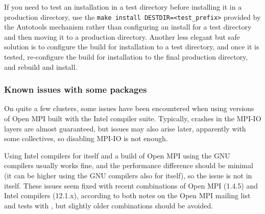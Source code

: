 \documentclass[a4paper,10pt,twoside]{article}
\begin{document}
If you need to test an installation in a test directory before
installing it in a production directory, use the
\texttt{make install DESTDIR=<test\_prefix>} provided
by the Autotools mechanism rather than configuring an install for a
test directory and then moving it to a production directory.
Another less elegant but safe solution is to configure the build for
installation to a test directory, and once it is tested,
re-configure the build for installation to the final production
directory, and rebuild and install.

\subsubsection{Known issues with some packages}

On quite a few clusters, some issues have been encountered
when using versions of Open MPI built with the Intel compiler
suite. Typically, crashes in the MPI-IO layers are almost
guaranteed, but issues may also arise later, apparently  with some
collectives, so disabling MPI-IO is not enough.

Using Intel compilers for \CS itself and a build of Open MPI
using the GNU compilers usually works fine, and the performance
difference should be minimal (it can be higher using
the GNU compilers also for \CS itself), so the issue is not
in \CS itself. These issues seem fixed with recent combinations
of Open MPI (1.4.5) and Intel compilers (12.1.x), according
to both notes on the Open MPI mailing list and tests with \CS,
but slightly older combinations should be avoided.
\end{document}

